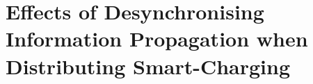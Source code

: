 \chapter{Effects of Desynchronising Information Propagation when Distributing Smart-Charging}
\label{ch3}









